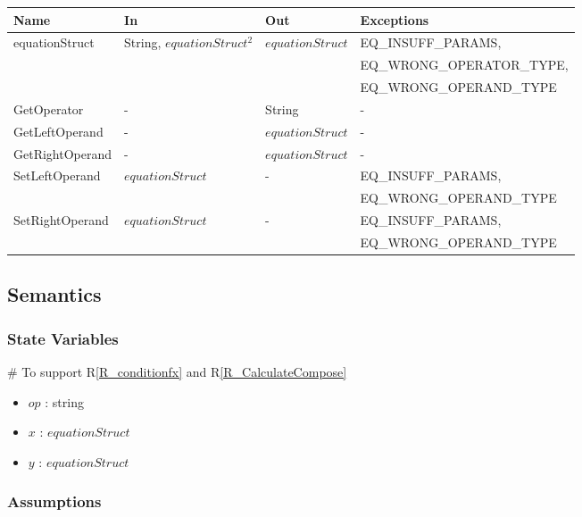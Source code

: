 \documentclass[12pt, titlepage]{article}
\newcommand{\rref}[1]{R\ref{#1}}
\begin{document}
\begin{center}
	\begin{tabular}{p{3cm} p{3cm} p{3cm} p{5cm}}
		\hline
		\textbf{Name} & \textbf{In} & \textbf{Out} & \textbf{Exceptions} \\
		\hline
		\multirow{3}{3cm}{equationStruct} & \multirow{3}{3cm}{String, 
		$equationStruct^2$} & \multirow{3}{3cm}{$equationStruct$} & 
		EQ\_INSUFF\_PARAMS,\\
		&  & & EQ\_WRONG\_OPERATOR\_TYPE,\\
		& & & EQ\_WRONG\_OPERAND\_TYPE\\
		GetOperator & - & String & - \\
		GetLeftOperand & - & $equationStruct$ & -\\
		GetRightOperand & - & $equationStruct$ & - \\
		\multirow{2}{3cm}{SetLeftOperand} & \multirow{2}{3cm}{$equationStruct$} 
		& \multirow{2}{3cm}{-} & EQ\_INSUFF\_PARAMS,\\
		& & & EQ\_WRONG\_OPERAND\_TYPE\\
		\multirow{2}{3cm}{SetRightOperand} & 
		\multirow{2}{3cm}{$equationStruct$} & \multirow{2}{3cm}{-} & 
		EQ\_INSUFF\_PARAMS,\\
		& & & EQ\_WRONG\_OPERAND\_TYPE\\
		\hline
	\end{tabular}
\end{center}

\subsection{Semantics}

\subsubsection{State Variables}

\# To support \rref{R_conditionfx} and \rref{R_CalculateCompose}
\begin{itemize}
	\item $op$ : string
	\item $x$ : $equationStruct$
	\item $y$ : $equationStruct$
\end{itemize}

\subsubsection{Assumptions}
\end{document}
